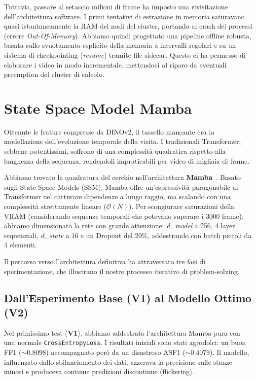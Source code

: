 \documentclass[a4paper,12pt]{report}
\begin{document}
Tuttavia, passare al setaccio milioni di frame ha imposto una rivisitazione dell'architettura software. I primi tentativi di estrazione in memoria saturavano quasi istantaneamente la RAM dei nodi del cluster, portando al crash dei processi (errore \emph{Out-Of-Memory}). Abbiamo quindi progettato una pipeline offline robusta, basata sullo svuotamento esplicito della memoria a intervalli regolari e su un sistema di checkpointing (\emph{resume}) tramite file sidecar. Questo ci ha permesso di elaborare i video in modo incrementale, mettendoci al riparo da eventuali preemption del cluster di calcolo.

\section{State Space Model Mamba}
Ottenute le feature compresse da DINOv2, il tassello mancante era la modellazione dell'evoluzione temporale della visita. I tradizionali Transformer, sebbene potentissimi, soffrono di una complessità quadratica rispetto alla lunghezza della sequenza, rendendoli impraticabili per video di migliaia di frame.

Abbiamo trovato la quadratura del cerchio nell'architettura \textbf{Mamba}~\cite{mamba}. Basato sugli State Space Models (SSM), Mamba offre un'espressività paragonabile ai Transformer nel catturare dipendenze a lungo raggio, ma scalando con una complessità strettamente lineare ($\mathcal{O}(N)$). Per scongiurare saturazioni della VRAM (considerando sequenze temporali che potevano superare i 3000 frame), abbiamo dimensionato la rete con grande attenzione: \emph{d\_model} a 256, 4 layer sequenziali, \emph{d\_state} a 16 e un Dropout del 20\%, addestrando con batch piccoli da 4 elementi.

Il percorso verso l'architettura definitiva ha attraversato tre fasi di sperimentazione, che illustrano il nostro processo iterativo di problem-solving.

\subsection{Dall'Esperimento Base (V1) al Modello Ottimo (V2)}
Nel primissimo test (\textbf{V1}), abbiamo addestrato l'architettura Mamba pura con una normale \texttt{CrossEntropyLoss}. I risultati iniziali sono stati agrodolci: un buon FF1 ($\sim$0.8098) accompagnato però da un disastroso ASF1 ($\sim$0.4079). Il modello, influenzato dallo sbilanciamento dei dati, azzerava la precisione sulle stanze minori e produceva continue predizioni discontinue (flickering).
\end{document}
